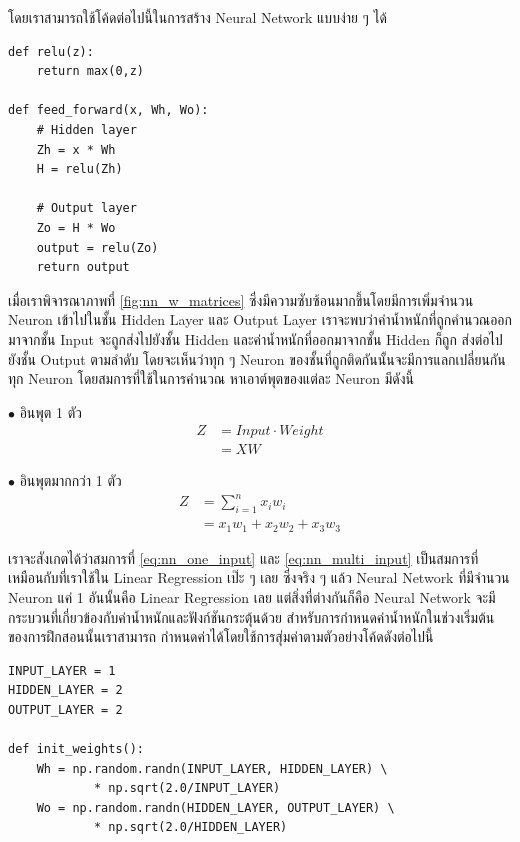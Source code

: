 โดยเราสามารถใช้โค้ดต่อไปนี้ในการสร้าง Neural Network แบบง่าย ๆ ได้

\begin{lstlisting}[style=MyPython]
def relu(z):
    return max(0,z)

def feed_forward(x, Wh, Wo):
    # Hidden layer
    Zh = x * Wh
    H = relu(Zh)

    # Output layer
    Zo = H * Wo
    output = relu(Zo)
    return output
\end{lstlisting}

เมื่อเราพิจารณาภาพที่ \ref{fig:nn_w_matrices} ซึ่งมีความซับซ้อนมากขึ้นโดยมีการเพิ่มจำนวน Neuron เข้าไปในชั้น Hidden Layer และ 
Output Layer เราจะพบว่าค่าน้ำหนักที่ถูกคำนวณออกมาจากชั้น Input จะถูกส่งไปยังชั้น Hidden และค่าน้ำหนักที่ออกมาจากชั้น Hidden ก็ถูก%
ส่งต่อไปยังชั้น Output ตามลำดับ โดยจะเห็นว่าทุก ๆ Neuron ของชั้นที่ถูกติดกันนั้นจะมีการแลกเปลี่ยนกันทุก Neuron โดยสมการที่ใช้ในการคำนวณ%
หาเอาต์พุตของแต่ละ Neuron มีดังนี้

\noindent $\bullet$ อินพุต 1 ตัว
\begin{align}\label{eq:nn_one_input}
    Z &= Input \cdot Weight \nonumber \\
    &= X W
\end{align}

\noindent $\bullet$ อินพุตมากกว่า 1 ตัว
\begin{align}\label{eq:nn_multi_input}
    Z &= \sum_{i=1}^{n}x_i w_i \nonumber \\
    &= x_1 w_1 + x_2 w_2 + x_3 w_3
\end{align}

เราจะสังเกตได้ว่าสมการที่ \ref{eq:nn_one_input} และ \ref{eq:nn_multi_input} เป็นสมการที่เหมือนกับที่เราใช้ใน Linear 
Regression เป๊ะ ๆ เลย ซึ่งจริง ๆ แล้ว Neural Network ที่มีจำนวน Neuron แค่ 1 อันนั้นคือ Linear Regression เลย แต่สิ่งที่ต่างกันก็คือ
Neural Network จะมีกระบวนที่เกี่ยวข้องกับค่าน้ำหนักและฟังก์ชันกระตุ้นด้วย สำหรับการกำหนดค่าน้ำหนักในช่วงเริ่มต้นของการฝึกสอนนั้นเราสามารถ%
กำหนดค่าได้โดยใช้การสุ่มค่าตามตัวอย่างโค้ดดังต่อไปนี้

\begin{lstlisting}[style=MyPython]
INPUT_LAYER = 1
HIDDEN_LAYER = 2
OUTPUT_LAYER = 2

def init_weights():
    Wh = np.random.randn(INPUT_LAYER, HIDDEN_LAYER) \
            * np.sqrt(2.0/INPUT_LAYER)
    Wo = np.random.randn(HIDDEN_LAYER, OUTPUT_LAYER) \
            * np.sqrt(2.0/HIDDEN_LAYER)
\end{lstlisting}

